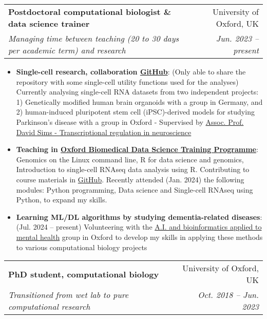 \documentclass[a4paper,11pt]{article}
\makeatletter
\newcommand{\resumeItem}[2]{
  \item\small{
    \textbf{#1}{: #2 \vspace{-2pt}}
  }
}
\newcommand{\resumeSubheading}[4]{
  \vspace{-1pt}\item
    \begin{tabular*}{0.97\textwidth}[t]{l@{\extracolsep{\fill}}r}
      \textbf{#1} & #2 \\
      \textit{\small#3} & \textit{\small #4} \\
    \end{tabular*}\vspace{-5pt}
}
\newcommand{\resumeItemListStart}{\begin{itemize}}
\newcommand{\resumeItemListEnd}{\end{itemize}\vspace{-5pt}}
\makeatother
\begin{document}
        \resumeSubheading
        {Postdoctoral computational biologist \& data science trainer}{University of Oxford, UK}{Managing time between teaching (20 to 30 days per academic term) and research}{Jun. 2023 -- present}
            \resumeItemListStart
                \resumeItem{Single-cell research, collaboration \href{https://github.com/liezeltamon/utils/tree/main/R}{GitHub}} {(Only able to share the repository with some single-cell utility functions used for the analyses) Currently analysing single-cell RNA datasets from two independent projects: 1) Genetically modified human brain organoids with a group in Germany, and 2) human-induced pluripotent stem cell (iPSC)-derived models for studying Parkinson's disease with a group in Oxford - Supervised by \href{https://www.rdm.ox.ac.uk/people/david-sims}{Assoc. Prof. David Sims - Transcriptional regulation in neuroscience}}
                \resumeItem{Teaching in \href{https://www.imm.ox.ac.uk/research/units-and-centres/mrc-wimm-centre-for-computational-biology/training/oxford-biomedical-data-science-training-programme}{Oxford Biomedical Data Science Training Programme}}{Genomics on the Linux command line, R for data science and genomics, Introduction to single-cell RNAseq data analysis using R. Contributing to course materials in {\href{https://github.com/kevinrue/OBDS_slides}{GitHub}}. Recently attended (Jan. 2024) the following modules: Python programming, Data science and Single-cell RNAseq using Python, to expand my skills.}
                 \resumeItem{Learning ML/DL algorithms by studying dementia-related diseases}{ (Jul. 2024 -- present) Volunteering with the \href{https://www.psych.ox.ac.uk/team/alejo-nevado-holgado}{A.I. and bioinformatics applied to mental health} group in Oxford to develop my skills in applying these methods to various computational biology projects}
            \resumeItemListEnd
        \resumeSubheading
        {PhD student, computational biology}{University of Oxford, UK}{Transitioned from wet lab to pure computational research}{Oct. 2018 -- Jun. 2023}
\end{document}

